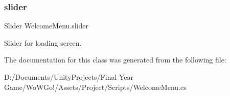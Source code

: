 \mbox{\label{class_welcome_menu_a05c5a113d36a31c141bb686cd8242d92}} 
\subsubsection{\texorpdfstring{slider}{slider}}
{\footnotesize\ttfamily Slider Welcome\+Menu.\+slider}



Slider for loading screen. 



The documentation for this class was generated from the following file\+:\begin{DoxyCompactItemize}
\item 
D\+:/\+Documents/\+Unity\+Projects/\+Final Year Game/\+Wo\+W\+Go!/\+Assets/\+Project/\+Scripts/Welcome\+Menu.\+cs\end{DoxyCompactItemize}
